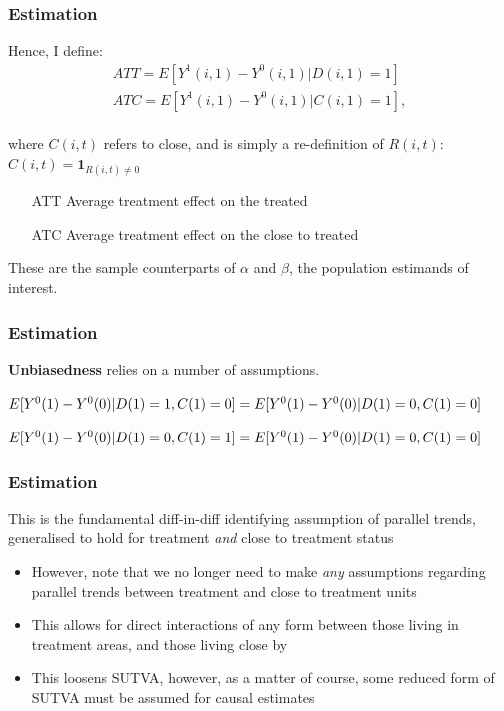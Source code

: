 \documentclass[10pt,letterpaper,subeqn]{beamer}
\begin{document}
\begin{frame}[label=estim3]
  \frametitle{Estimation}
Hence, I define:
\vspace{4mm}
\begin{eqnarray}
\label{Seqn:estimATT}
ATT=E[Y^1(i,1)-Y^0(i,1)|D(i,1)=1]\  \\
\label{Seqn:estimATC}
ATC=E[Y^1(i,1)-Y^0(i,1)|C(i,1)=1],
\end{eqnarray}
\vspace{4mm} \\
where $C(i,t)$ refers to close, and is simply a re-definition of $R(i,t)$:
$C(i,t)=\mathbf{1}_{R(i,t)\neq 0}$
\vspace{4mm} \\
\begin{enumerate}
\item[ATT] Average treatment effect on the treated
\item[ATC] Average treatment effect on the close to treated
\end{enumerate}
These are the sample counterparts of $\alpha$ and $\beta$, the population 
estimands of interest.

\end{frame}



\begin{frame}[label=estim4]
  \frametitle{Estimation}
\textbf{Unbiasedness} relies on a number of assumptions. \\
\vspace{5mm}

\begin{tcolorbox}[title =1. Parallel trends in treatment and control]
$E[Y^0(1)-Y^0(0)|D(1)=1,C(1)=0]= \\
E[Y^0(1)-Y^0(0)|D(1)=0,C(1)=0]$
\end{tcolorbox}

\begin{tcolorbox}[title =2. Parallel trends in close and control]
$E[Y^0(1)-Y^0(0)|D(1)=0,C(1)=1]= \\
E[Y^0(1)-Y^0(0)|D(1)=0,C(1)=0]$
\end{tcolorbox}

\end{frame}


\begin{frame}[label=estim5]
  \frametitle{Estimation}
This is the fundamental diff-in-diff identifying assumption of parallel trends, 
generalised to hold for treatment \emph{and} close to treatment status
\vspace{4mm} \\
\begin{itemize}
\item However, note that we no longer need to make \emph{any} assumptions 
regarding parallel trends between treatment and close to treatment units
\item This allows for direct interactions of any form between those living in 
treatment areas, and those living close by
\item This loosens SUTVA, however, as a matter of course, some reduced form of 
SUTVA must be assumed for causal estimates
\end{itemize}
\end{frame}
\end{document}
